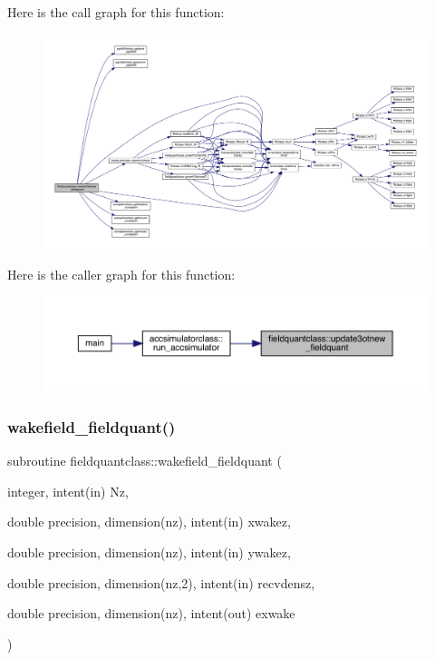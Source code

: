Here is the call graph for this function\+:
\nopagebreak
\begin{figure}[H]
\begin{center}
\leavevmode
\includegraphics[width=350pt]{namespacefieldquantclass_a06d0461c3c52859b9fa8b0c4d5f0db46_cgraph}
\end{center}
\end{figure}
Here is the caller graph for this function\+:\nopagebreak
\begin{figure}[H]
\begin{center}
\leavevmode
\includegraphics[width=350pt]{namespacefieldquantclass_a06d0461c3c52859b9fa8b0c4d5f0db46_icgraph}
\end{center}
\end{figure}
\mbox{\label{namespacefieldquantclass_a61fa5f8980736fbc19fa50224214727b}} 
\subsubsection{\texorpdfstring{wakefield\_fieldquant()}{wakefield\_fieldquant()}}
{\footnotesize\ttfamily subroutine fieldquantclass\+::wakefield\+\_\+fieldquant (\begin{DoxyParamCaption}\item[{integer, intent(in)}]{Nz,  }\item[{double precision, dimension(nz), intent(in)}]{xwakez,  }\item[{double precision, dimension(nz), intent(in)}]{ywakez,  }\item[{double precision, dimension(nz,2), intent(in)}]{recvdensz,  }\item[{double precision, dimension(nz), intent(out)}]{exwake }\end{DoxyParamCaption})}



